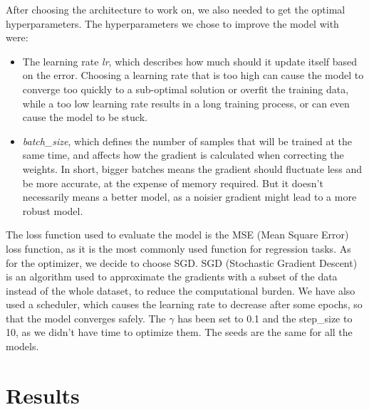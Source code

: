\documentclass[10pt,conference]{IEEEtran}
\begin{document}
After choosing the architecture to work on, we also needed to get the optimal hyperparameters. The hyperparameters we chose to improve the model with were:
\begin{itemize}
  \item The learning rate \textit{lr}, which describes how much should it update itself based on the error. Choosing a learning rate that is too high can cause the model to converge too quickly to a sub-optimal solution or overfit the training data, while a too low learning rate results in a long training process, or can even cause the model to be stuck.
  \item \textit{batch\_size}, which defines the number of samples that will be trained at the same time, and affects how the gradient is calculated when correcting the weights. In short, bigger batches means the gradient should fluctuate less and be more accurate, at the expense of memory required. But it doesn't necessarily means a better model, as a noisier gradient might lead to a more robust model.
\end{itemize}
 
The loss function used to evaluate the model is the MSE (Mean Square Error) loss function, as it is the most commonly used function for regression tasks. As for the optimizer, we decide to choose SGD. SGD (Stochastic Gradient Descent) is an algorithm used to approximate the gradients with a subset of the data instead of the whole dataset, to reduce the computational burden. We have also used a scheduler, which causes the learning rate to decrease after some epochs, so that the model converges safely. The $\gamma$ has been set to 0.1 and the step\_size to 10, as we didn't have time to optimize them. The seeds are the same for all the models.

\section{Results}
\end{document}
